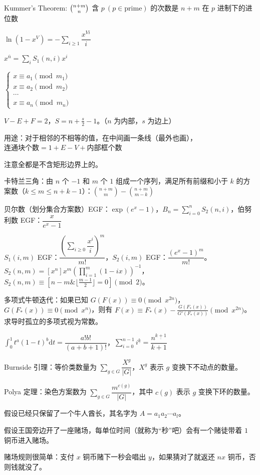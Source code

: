 \documentclass[12pt]{ctexart}
\begin{document}
Kummer's Theorem: $\tbinom{n+m}{n}$ 含 $p~(p\in \text {prime})$ 的次数是 $n+m$ 在 $p$ 进制下的进位数

$\ln (1-x^V)=-\sum\limits_{i\ge1}\dfrac{x^{Vi}}{i}$

$x^{\bar n}=\sum\limits_i S_1(n,i)x^i$

$\begin{cases}x\equiv a_1\pmod {m_1}\\x\equiv a_2\pmod {m_2}\\\cdots\\x\equiv a_n\pmod {m_n}\end{cases}$

$V-E+F=2$，$S=n+\frac s2-1$。（$n$ 为内部，$s$ 为边上）

用途：对于相邻的不相等的值，在中间画一条线（最外也画），$\text{连通块个数}=1+E-V+\text{内部框个数}$

注意全都是不含矩形边界上的。

卡特兰三角：由 $n$ 个 $-1$ 和 $m$ 个 $1$ 组成一个序列，满足所有前缀和小于 $k$ 的方案数（$k\le m\le n+k-1$）：$\binom{n+m}{m}-\binom{n+m}{m-k}$

贝尔数（划分集合方案数）EGF：$\exp(e^x-1)$，$B_n=\sum\limits_{i=0}^n S_2(n,i)$，伯努利数 EGF：$\dfrac{x}{e^x-1}$

$S_1(i,m)$ EGF：$\dfrac{(\sum\limits_{i\ge 0}\dfrac{x^i}i)^m}{m!}$，$S_2(i,m)$ EGF：$\dfrac{(e^x-1)^m}{m!}$。$S_2(n,m)=[x^n]x^m(\prod\limits_{i=1}^m(1-ix))^{-1}$，$S_2(n,m)\equiv [n-m\&\lfloor\frac{m-1}{2}\rfloor=0]\pmod 2$。

多项式牛顿迭代：如果已知 $G(F(x))\equiv0\pmod{x^{2n}}$，$G(F_*(x))\equiv0\pmod {x^n}$，则有 $F(x)\equiv F_*(x)-\frac{G(F_*(x))}{G'(F_*(x))}\pmod{x^{2n}}$。求导时孤立的多项式视为常数。

$\int_0^1 t^a(1-t)^b\mathrm{d}t=\dfrac{a!b!}{(a+b+1)!}$，$\sum\limits_{i=0}^{n-1}i^{\underline{k}}=\dfrac{n^{\underline{k+1}}}{k+1}$

Burnside 引理：等价类数量为 $\sum\limits_{g\in G}\dfrac{X^g}{|G|}$，$X^g$ 表示 $g$ 变换下不动点的数量。

Polya 定理：染色方案数为 $\sum\limits_{g\in G}\dfrac{m^{c(g)}}{|G|}$，其中 $c(g)$ 表示 $g$ 变换下环的数量。

假设已经只保留了一个牛人酋长，其名字为 $A=a_1a_2\cdots a_l$。

假设王国旁边开了一座赌场，每单位时间（就称为“秒”吧）会有一个赌徒带着 $1$ 铜币进入赌场。

赌场规则很简单：支付 $x$ 铜币赌下一秒会唱出 $y$，如果猜对了就返还 $nx$ 铜币，否则钱就没了。
\end{document}
